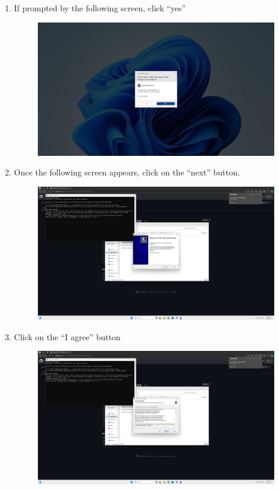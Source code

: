 \documentclass[12pt]{article}
\begin{document}
\begin{center}
\begin{enumerate}
\begin{figure}[H]
		      \end{figure}
		\item If prompted by the following screen, click ``yes''
		      \begin{figure}[H]
			      \includegraphics[width=\textwidth]{Figures/Windows-UAC-Ghostscript.png}
		      \end{figure}
		\item Once the following screen appears, click on the ``next'' button.
		      \begin{figure}[H]
			      \includegraphics[width=\textwidth]{Figures/Windows-Ghostscript-Menu-1.png}
		      \end{figure}
		\item Click on the ``I agree'' button
		      \begin{figure}[H]
			      \includegraphics[width=\textwidth]{Figures/Windows-Ghostscript-Menu-2.png}

\end{figure}
\end{enumerate}
\end{center}
\end{document}
